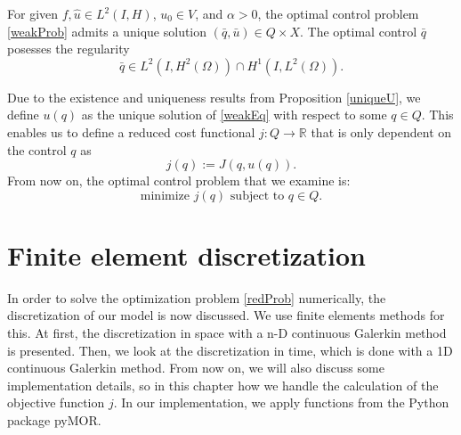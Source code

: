 \begin{prop}
For given $f,\hat{u}\in L^2(I,H)$, $u_0\in V$, and $\alpha>0$, the optimal control problem \eqref{weakProb} admits a unique solution $(\bar{q},\bar{u})\in Q\times X$. The optimal control $\bar{q}$ posesses the regularity
\begin{displaymath}
\bar{q}\in L^2(I,H^2(\Omega))\cap H^1(I,L^2(\Omega)).
\end{displaymath}
\end{prop}

Due to the existence and uniqueness results from Proposition \ref{uniqueU}, we define $u(q)$ as the unique solution of \eqref{weakEq} with respect to some $q\in Q$. This enables us to define a reduced cost functional $j:Q\to \mathbb{R}$ that is only dependent on the control $q$ as
\begin{displaymath}
j(q):=J(q,u(q)).
\end{displaymath}
From now on, the optimal control problem that we examine is:
\begin{equation}
\label{redProb}
\text{minimize }j(q)\text{ subject to }q\in Q.
\end{equation}

\section{Finite element discretization}
In order to solve the optimization problem \eqref{redProb} numerically, the discretization of our model is now discussed. We use finite elements methods \cite{doi:10.1137/1.9780898717440, articleMeidner} for this. At first, the discretization in space with a n-D continuous Galerkin method is presented. Then, we look at the discretization in time, which is done with a 1D continuous Galerkin method. From now on, we will also discuss some implementation details, so in this chapter how we handle the calculation of the objective function $j$. In our implementation, we apply functions from the Python package pyMOR.

